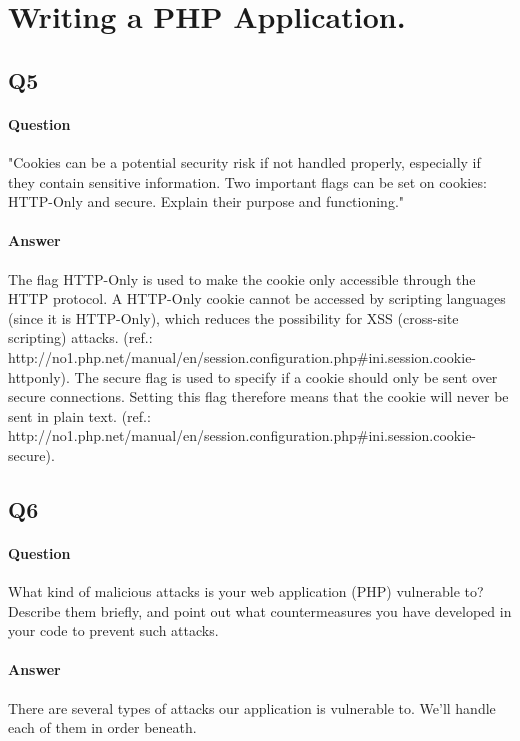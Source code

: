 \documentclass[11pt, a4paper]{article}
\begin{document}
\section{Writing a PHP Application.}
\subsection{Q5}
\paragraph{Question}
"Cookies can be a potential security risk if not handled properly, especially if they contain
sensitive information. Two important flags can be set on cookies: HTTP-Only and secure.
Explain their purpose and functioning."
\paragraph{Answer}
The flag HTTP-Only is used to make the cookie only accessible through the HTTP protocol. A HTTP-Only cookie cannot be accessed by scripting languages (since it is HTTP-Only), which reduces the possibility for XSS (cross-site scripting) attacks. (ref.: http://no1.php.net/manual/en/session.configuration.php\#ini.session.cookie-httponly).
The secure flag is used to specify if a cookie should only be sent over secure connections. Setting this flag therefore means that the cookie will never be sent in plain text. (ref.: http://no1.php.net/manual/en/session.configuration.php\#ini.session.cookie-secure).
\subsection{Q6}
\paragraph{Question}
What kind of malicious attacks is your web application (PHP) vulnerable to? Describe
them briefly, and point out what countermeasures you have developed in your code to prevent
such attacks.
\paragraph{Answer}
There are several types of attacks our application is vulnerable to. We'll handle each of them in order beneath.
\end{document}
